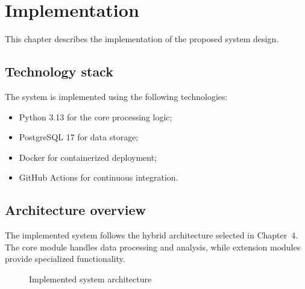 \section{Implementation}

This chapter describes the implementation of the proposed system design.

\subsection{Technology stack}

The system is implemented using the following technologies:
\begin{itemize}
  \item Python 3.13 for the core processing logic;
  \item PostgreSQL 17 for data storage;
  \item Docker for containerized deployment;
  \item GitHub Actions for continuous integration.
\end{itemize}

\subsection{Architecture overview}

The implemented system follows the hybrid architecture selected in Chapter~4.
The core module handles data processing and analysis, while extension modules provide specialized functionality.

\begin{figure}[H]
    \centering
    \caption{Implemented system architecture} \label{fig:impl-arch}
\end{figure}

